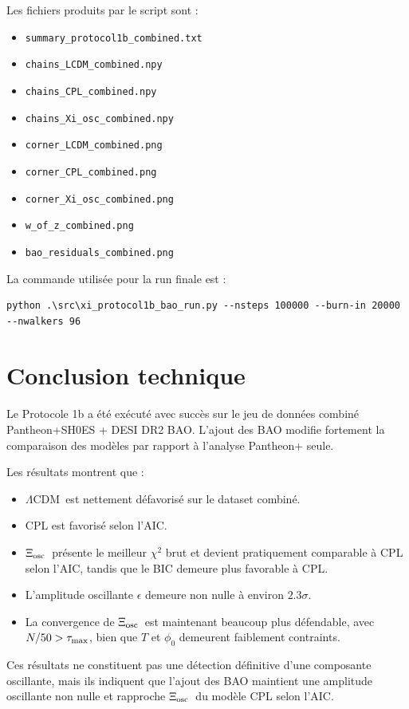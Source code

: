 \documentclass[11pt]{article}
\newcommand{\LCDM}{$\Lambda$CDM}
\newcommand{\Xiosc}{$\Xi_{\rm osc}$}
\begin{document}
Les fichiers produits par le script sont :
\begin{itemize}
    \item \texttt{summary\_protocol1b\_combined.txt}
    \item \texttt{chains\_LCDM\_combined.npy}
    \item \texttt{chains\_CPL\_combined.npy}
    \item \texttt{chains\_Xi\_osc\_combined.npy}
    \item \texttt{corner\_LCDM\_combined.png}
    \item \texttt{corner\_CPL\_combined.png}
    \item \texttt{corner\_Xi\_osc\_combined.png}
    \item \texttt{w\_of\_z\_combined.png}
    \item \texttt{bao\_residuals\_combined.png}
\end{itemize}

La commande utilisée pour la run finale est :
\begin{verbatim}
python .\src\xi_protocol1b_bao_run.py --nsteps 100000 --burn-in 20000 --nwalkers 96
\end{verbatim}

\section{Conclusion technique}

Le Protocole 1b a été exécuté avec succès sur le jeu de données combiné Pantheon+SH0ES + DESI DR2 BAO. L'ajout des BAO modifie fortement la comparaison des modèles par rapport à l'analyse Pantheon+ seule.

Les résultats montrent que :
\begin{itemize}
    \item \LCDM\ est nettement défavorisé sur le dataset combiné.
    \item CPL est favorisé selon l'AIC.
    \item \Xiosc\ présente le meilleur $\chi^2$ brut et devient pratiquement comparable à CPL selon l'AIC, tandis que le BIC demeure plus favorable à CPL.
    \item L'amplitude oscillante $\epsilon$ demeure non nulle à environ $2.3\sigma$.
    \item La convergence de \Xiosc\ est maintenant beaucoup plus défendable, avec $N/50>\tau_{\rm max}$, bien que $T$ et $\phi_0$ demeurent faiblement contraints.
\end{itemize}

Ces résultats ne constituent pas une détection définitive d'une composante oscillante, mais ils indiquent que l'ajout des BAO maintient une amplitude oscillante non nulle et rapproche \Xiosc\ du modèle CPL selon l'AIC.
\end{document}
